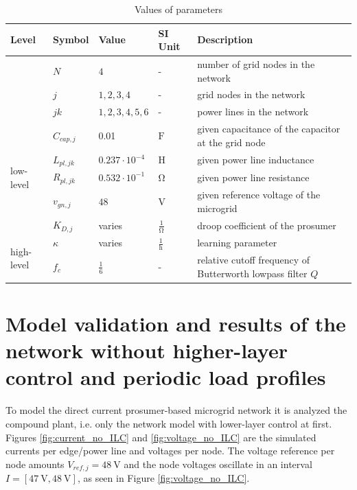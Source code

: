 \begin{table}[htbp]
	\centering
	\footnotesize
	\begin{tabular}{@{}lllll@{}}
		\toprule
		\textbf{Level}              & \textbf{Symbol} & \textbf{Value}        & \textbf{SI Unit}  & \textbf{Description}                                        \\ \midrule
		\multirow{3}{*}{}           & $N$             & $4$                   & -                 & number of grid nodes in the network                         \\
		& $j$             & $1,2,3,4$             & -                 & grid nodes in the network                                   \\
		& $jk$            & $1,2,3,4,5,6$         & -                 & power lines in the network                                  \\ \midrule
		\multirow{5}{*}{low-level}  & $C_{cap,j}$     & 0.01                  & $\si{\farad}$          & given capacitance of the capacitor at the grid node         \\
		& $L_{pl,jk}$     & $0.237\cdot 10^{-4}$  & $\si{\henry}$          & given power line inductance                                 \\
		& $R_{pl,jk}$     & $0.532 \cdot 10^{-1}$ & $\si{\ohm}$            & given power line resistance                                 \\
		& $v_{gn,j}$      & $48$                  & $\si{\volt}$           & given reference voltage of the microgrid                    \\
		& $K_{D,j}$         & varies                  & $\frac{1}{\si{\ohm}}$  & droop coefficient of the prosumer                           \\ \midrule
		\multirow{2}{*}{high-level} & $\kappa$        & varies                  & $\frac{1}{\si{\hour}}$ & learning parameter                                          \\
		& $f_c$           & $\frac{1}{6}$         & -                 & relative cutoff frequency of Butterworth lowpass filter $Q$ \\ \bottomrule
	\end{tabular}
\caption{Values of parameters}
\label{tab:parameters}
\end{table}
\section{Model validation and results of the network without higher-layer control and periodic load profiles}
\label{sec:valid_no_ILC}
To model the direct current prosumer-based microgrid network it is analyzed the compound plant, i.e. only the network model with lower-layer control at first. Figures \ref{fig:current_no_ILC} and \ref{fig:voltage_no_ILC} are the simulated currents per edge/power line and voltages per node. The voltage reference per node amounts $V_{ref,j} = \SI{48}{\volt}$ and the node voltages oscillate in an interval $I = [\SI{47}{\volt},\SI{48}{\volt}]$, as seen in Figure \ref{fig:voltage_no_ILC}.
